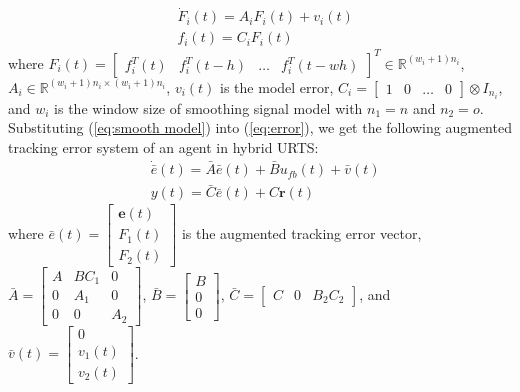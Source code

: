 \documentclass{ieeeaccess}
\newtheorem{remark}{Remark}
\begin{document}
\begin{equation} \label{eq:smooth model}
    \begin{split}
        & \dot{F}_i(t)=A_iF_i(t)+v_i(t) \\
        & f_i(t)=C_iF_i(t)        
    \end{split}
\end{equation}
where $F_i(t)=\begin{bmatrix}
    f_i^T(t) & f_i^T(t-h) & \dots & f_i^T(t-wh)
\end{bmatrix}^T\in\mathbb{R}^{(w_i+1)n_i}$, $A_i\in\mathbb{R}^{{(w_i+1)n_i}\times{(w_i+1)n_i}}$, $v_i(t)$ is the model error, $C_i=\begin{bmatrix}
        1 & 0 & \dots & 0
    \end{bmatrix}\otimes I_{n_i}$, and $w_i$ is the window size of smoothing signal model with $n_1=n$ and $n_2 = o$. Substituting (\ref{eq:smooth model}) into (\ref{eq:error}), we get the following augmented tracking error system of an agent in hybrid URTS:
\begin{equation} \label{eq:e_bar}
    \begin{split}
        & \dot{\bar{e}}(t) = \bar{A}\bar{e}(t)+\bar{B}u_{fb}(t)+\bar{v}(t) \\
        & y(t)=\bar{C}\bar{e}(t) + C\pmb{r}(t)
    \end{split}
\end{equation}
where $\bar{e}(t) = \begin{bmatrix}
    \pmb{e}(t) \\ F_1(t) \\ F_2(t)
\end{bmatrix}$ is the augmented tracking error vector, $\bar{A}=\begin{bmatrix}
    A & BC_1 & 0 \\
    0 & A_1 & 0 \\
    0 & 0 & A_2
\end{bmatrix}$, $\bar{B}=\begin{bmatrix}
    B \\ 0 \\ 0
\end{bmatrix}$, $\bar{C}=\begin{bmatrix}
    C & 0 & B_2C_2
\end{bmatrix}$, and $\bar{v}(t)=\begin{bmatrix}
    0 \\ v_1(t) \\ v_2(t)
\end{bmatrix}$.
\end{document}
